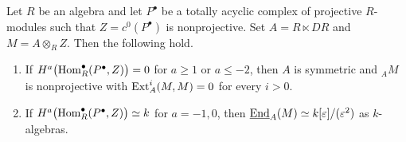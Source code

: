 \documentclass[11pt]{article}
\begin{document}
\begin{Theo}\label{frame:transfer}
Let $R$ be an algebra and let $P^\bullet$ be a totally acyclic complex of projective
$R$-modules such that $Z=c^0(P^\bullet)$ is nonprojective.
Set $A=R\ltimes DR$ and $M=A\otimes_RZ$. Then the following hold.
\begin{enumerate}
\item If $H^a\big({\rm Hom}_R^\bullet(P^\bullet,Z)\big)=0$ for $a\ge1$ or $a\le-2$,
then $A$ is symmetric and ${_A}M$ is nonprojective with
${\rm Ext}_A^i(M,M)=0$ for every $i>0$.
\item If $H^a\big({\rm Hom}_R^\bullet(P^\bullet,Z)\big)\simeq k$ for
$a=-1,0$, then
\mbox{$\underline{{\rm End}}_A(M)\simeq k[\varepsilon]/(\varepsilon^2)$}
as $k$-algebras.
\end{enumerate}
\end{Theo}
\end{document}
